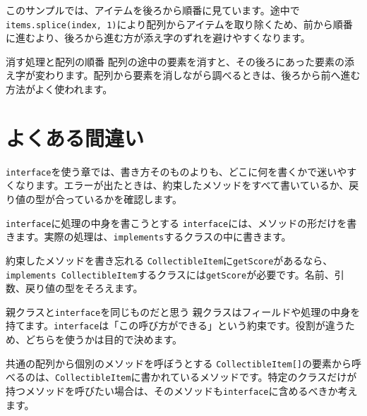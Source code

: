 \begin{listing}[htbp]
\inputminted{ts}{typescript-p5/listings/chapter19/complete-leaf-game.ts}
\caption{落ち葉拾いゲームの全体の流れ（\texttt{chapter19/complete-leaf-game.ts}）}
\label{lst:chapter19-complete-leaf-game}
\end{listing}

このサンプルでは、アイテムを後ろから順番に見ています。途中で\texttt{items.splice(index, 1)}により配列からアイテムを取り除くため、前から順番に進むより、後ろから進む方が添え字のずれを避けやすくなります。

\begin{mistakebox}{消す処理と配列の順番}
配列の途中の要素を消すと、その後ろにあった要素の添え字が変わります。配列から要素を消しながら調べるときは、後ろから前へ進む方法がよく使われます。
\end{mistakebox}

\section{よくある間違い}

\texttt{interface}を使う章では、書き方そのものよりも、どこに何を書くかで迷いやすくなります。エラーが出たときは、約束したメソッドをすべて書いているか、戻り値の型が合っているかを確認します。

\begin{mistakebox}{\texttt{interface}に処理の中身を書こうとする}
\texttt{interface}には、メソッドの形だけを書きます。実際の処理は、\texttt{implements}するクラスの中に書きます。
\end{mistakebox}

\begin{mistakebox}{約束したメソッドを書き忘れる}
\texttt{CollectibleItem}に\texttt{getScore}があるなら、\texttt{implements CollectibleItem}するクラスには\texttt{getScore}が必要です。名前、引数、戻り値の型をそろえます。
\end{mistakebox}

\begin{mistakebox}{親クラスと\texttt{interface}を同じものだと思う}
親クラスはフィールドや処理の中身を持てます。\texttt{interface}は「この呼び方ができる」という約束です。役割が違うため、どちらを使うかは目的で決めます。
\end{mistakebox}

\begin{mistakebox}{共通の配列から個別のメソッドを呼ぼうとする}
\texttt{CollectibleItem[]}の要素から呼べるのは、\texttt{CollectibleItem}に書かれているメソッドです。特定のクラスだけが持つメソッドを呼びたい場合は、そのメソッドも\texttt{interface}に含めるべきか考えます。
\end{mistakebox}

